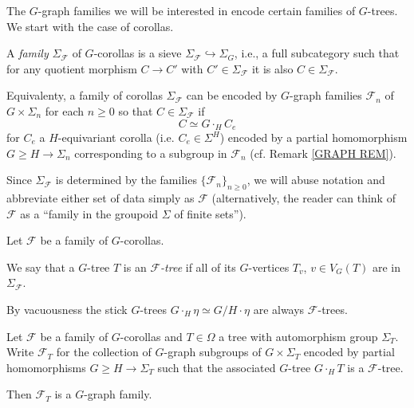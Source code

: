 \documentclass[a4paper,10pt]{article}%
\begin{document}
The $G$-graph families we will be interested in encode certain families of $G$-trees. We start with the case of corollas.


\begin{definition}
  A \textit{family} $\Sigma_{\mathcal{F}}$ of $G$-corollas is a sieve 
  $\Sigma_{\mathcal{F}} \hookrightarrow \Sigma_G$, i.e., a full subcategory such that for any quotient morphism $C \to C'$ with $C' \in \Sigma_{\mathcal{F}}$ it is also $C \in \Sigma_{\mathcal{F}}$.
\end{definition}

\begin{remark}
  Equivalenty, a family of corollas $\Sigma_{\mathcal{F}}$
  can be encoded by
  $G$-graph families $\mathcal{F}_n$ of $G \times \Sigma_n$ for each $n \geq 0$ so that $C \in \Sigma_{\mathcal{F}}$ if 
  \[C \simeq G \cdot_H C_e\]
  for $C_e$ a $H$-equivariant corolla 
  (i.e. $C_e \in \Sigma^H$)
  encoded by a partial homomorphism $G \geq H \to \Sigma_n$ corresponding to a subgroup in $\mathcal{F}_n$ 
  (cf. Remark \ref{GRAPH REM}). 
\end{remark}

Since $\Sigma_{\mathcal{F}}$ is determined by the families $\{\mathcal{F}_n\}_{n \geq 0}$, we will abuse notation and abbreviate either set of data simply as $\mathcal{F}$ (alternatively, the reader can think of $\mathcal{F}$ as a ``family in the groupoid $\Sigma$ of finite sets''). 


\begin{definition}

Let $\mathcal{F}$ be a family of $G$-corollas.

We say that a $G$-tree $T$ is an \textit{$\mathcal{F}$-tree}
if all of its $G$-vertices $T_{v}$, $v \in V_G(T)$ are in 
$\Sigma_{\mathcal{F}}$.

\end{definition}


\begin{remark}\label{VACUOUSNESS REM}

	By vacuousness the stick $G$-trees
	$G \cdot_H \eta \simeq G/H \cdot \eta$ are always $\mathcal{F}$-trees.

\end{remark}


\begin{proposition}

	Let $\mathcal{F}$ be a family of $G$-corollas and $T \in \Omega$ a tree with automorphism group $\Sigma_T$.
	Write $\mathcal{F}_T$ for the collection of $G$-graph subgroups of 
	$G \times \Sigma_T$ encoded by partial homomorphisms
	$G \geq H \to \Sigma_T$ such that the associated $G$-tree
	$G \cdot_H T$ is a $\mathcal{F}$-tree.
	
	Then $\mathcal{F}_T$ is a $G$-graph family.

\end{proposition}
\end{document}
